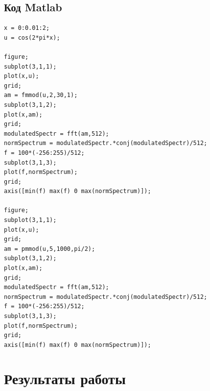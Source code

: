 \subsection{Код Matlab}
\begin{lstlisting}
x = 0:0.01:2;
u = cos(2*pi*x);

figure;
subplot(3,1,1);
plot(x,u);
grid;
am = fmmod(u,2,30,1);
subplot(3,1,2);
plot(x,am);
grid;
modulatedSpectr = fft(am,512);
normSpectrum = modulatedSpectr.*conj(modulatedSpectr)/512;
f = 100*(-256:255)/512;
subplot(3,1,3);
plot(f,normSpectrum);
grid;
axis([min(f) max(f) 0 max(normSpectrum)]);

figure;
subplot(3,1,1);
plot(x,u);
grid;
am = pmmod(u,5,1000,pi/2);
subplot(3,1,2);
plot(x,am);
grid;
modulatedSpectr = fft(am,512);
normSpectrum = modulatedSpectr.*conj(modulatedSpectr)/512;
f = 100*(-256:255)/512;
subplot(3,1,3);
plot(f,normSpectrum);
grid;
axis([min(f) max(f) 0 max(normSpectrum)]);
\end{lstlisting}
\section{Результаты работы}



